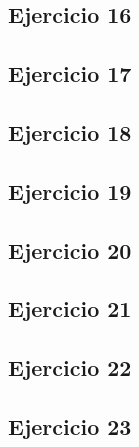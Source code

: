 \subsection{Ejercicio 16}
\subsection{Ejercicio 17}
\subsection{Ejercicio 18}
\subsection{Ejercicio 19}
\subsection{Ejercicio 20}
\subsection{Ejercicio 21}
\subsection{Ejercicio 22}
\subsection{Ejercicio 23}
